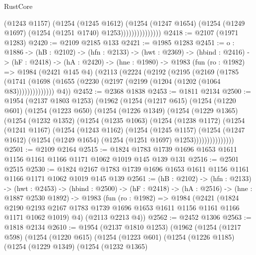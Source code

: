 \begin{lexlean}{RustCore}
\begin{coremodule}
                          (@1243 @1157)
                          (@1254
                            (@1245 @1612)
                            (@1254
                              (@1247 @1654)
                              (@1254 (@1249 @1697) (@1254 (@1251 @1740) @1253)))))))))))))))
@2418 := @2107 (@1971 @1283)
@2420 := @2109 @2185 @133
@2421 := @1985 @1283
@2451 := {o : @1886} ->
  (hB : @2102) ->
  (hfn : @2133) ->
  (hwt : @2369) ->
  (hbind : @2416) ->
  (hF : @2418) ->
  (hA : @2420) ->
  (hne : @1980) ->
  @1983
    (fun (ro : @1982) =>
    @1984
      (@2421 @145 @4)
      (@2113
        (@2224
          (@2192
            (@2195
              (@2169
                (@1785
                  (@1741 (@1698 (@1655 (@2230 (@2197 (@2199 (@1204 (@1202 (@1064 @83))))))))))))))
        @4))
@2452 := @2368 @1838
@2453 := @1811 @2134
@2500 := @1954
    (@2137 @1803 @1253)
    (@1962
      (@1254
        (@1217 @615)
        (@1254
          (@1220 @601)
          (@1254
            (@1223 @650)
            (@1254
              (@1226 @1349)
              (@1254
                (@1229 @1365)
                (@1254
                  (@1232 @1352)
                  (@1254
                    (@1235 @1063)
                    (@1254
                      (@1238 @1172)
                      (@1254
                        (@1241 @1167)
                        (@1254
                          (@1243 @1162)
                          (@1254
                            (@1245 @1157)
                            (@1254
                              (@1247 @1612)
                              (@1254 (@1249 @1654) (@1254 (@1251 @1697) @1253)))))))))))))))
@2501 := @2109 @2164
@2515 := @1824 @1783 @1739 @1696 @1653 @1611 @1156 @1161 @1166 @1171 @1062 @1019 @145 @139 @131
@2516 := @2501 @2515
@2530 := @1824 @2167 @1783 @1739 @1696 @1653 @1611 @1156 @1161 @1166 @1171 @1062 @1019 @145 @139
@2561 := (hB : @2102) ->
  (hfn : @2133) ->
  (hwt : @2453) ->
  (hbind : @2500) ->
  (hF : @2418) ->
  (hA : @2516) ->
  (hne : @1887 @2530 @1892) ->
  @1983
    (fun (ro : @1982) =>
    @1984
      (@2421
        (@1824 @2190 @2193 @2167 @1783 @1739 @1696 @1653 @1611 @1156 @1161 @1166 @1171 @1062 @1019)
        @4)
      (@2113 @2213 @4))
@2562 := @2452 @1306
@2563 := @1818 @2134
@2610 := @1954
    (@2137 @1810 @1253)
    (@1962
      (@1254
        (@1217 @598)
        (@1254
          (@1220 @615)
          (@1254
            (@1223 @601)
            (@1254
              (@1226 @1185)
              (@1254
                (@1229 @1349)
                (@1254
                  (@1232 @1365)

\end{coremodule}
\end{lexlean}
